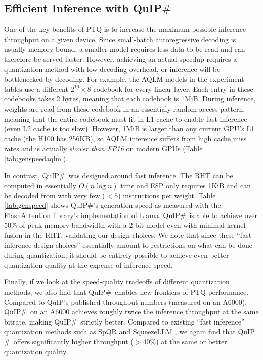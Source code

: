 \subsection{Efficient Inference with QuIP$\#$}

One of the key benefits of PTQ is to increase the maximum possible inference throughput on a given device. Since small-batch autoregressive decoding is usually memory bound, a smaller model requires less data to be read and can therefore be served faster. However, achieving an actual speedup requires a quantization method with low decoding overhead, or inference will be bottlenecked by decoding. For example, the AQLM models in the experiment tables use a different $2^{16} \times 8$ codebook for every linear layer. Each entry in these codebooks takes 2 bytes, meaning that each codebook is 1MiB. During inference, weights are read from these codebook in an essentialy random access pattern, meaning that the entire codebook must fit in L1 cache to enable fast inference (even L2 cache is too slow). However, 1MiB is larger than any current GPU's L1 cache (the H100 has 256KB), so AQLM inference suffers from high cache miss rates and is actually \textit{slower than FP16} on modern GPUs (Table \ref{tab:genspeedaqlm}).

In contrast, QuIP$\#$\  was designed around fast inference. The RHT can be computed in essentially $O(n \log n)$ time and E8P only requires 1KiB and can be decoded from with very few ($<5$) instructions per weight. Table \ref{tab:genspeed} shows QuIP$\#$'s generation speed as measured with the FlashAttention library's \cite{dao2022flashattention, dao2023flashattention2} implementation of Llama.
QuIP$\#$\  is able to achieve over 50\% of peak memory bandwidth with a 2 bit model even with minimal kernel fusion in the RHT, validating our design choices. We note that since these ``fast inference design choices'' essentially amount to restrictions on what can be done during quantization, it should be entirely possible to achieve even better quantization quality at the expense of inference speed.

Finally, if we look at the speed-quality tradeoffs of different quantization methods, we also find that QuIP$\#$\  enables new frontiers of PTQ performance. Compared to QuIP's published throughput numbers (measured on an A6000), QuIP$\#$\  on an A6000 achieves roughly twice the inference throughput at the same bitrate, making QuIP$\#$\  strictly better. Compared to existing ``fast inference'' quantization methods such as SpQR \cite{dettmers2023spqr} and SqueezeLLM \cite{kim2023squeezellm}, we again find that QuIP$\#$\  offers significantly higher throughput ($>40\%$) at the same or better quantization quality.

